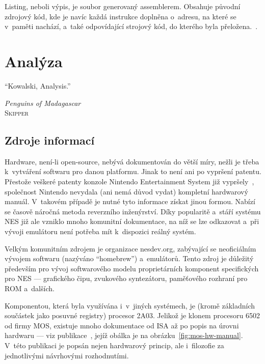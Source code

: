 \begin{definition}[Listing]
	Listing, neboli výpis, je soubor generovaný assemblerem. Obsahuje původní zdrojový kód, kde je navíc každá instrukce doplněna o~adresu, na které se v~paměti nachází, a~také odpovídající strojový kód, do kterého byla přeložena.~\cite{Plantz2021:computer-organization}.
\end{definition}

\chapter{Analýza}
\epigraph{
	\enquote{Kowalski, Analysis.}
}{\textit{Penguins of Madagascar}\\ \textsc{Skipper}}

\section{Zdroje informací}
Hardware, není-li open-source, nebývá dokumentován do větší míry, nežli je třeba k~vytváření softwaru pro danou platformu. Jinak to není ani po vypršení patentu. Přestože veškeré patenty konzole Nintendo Entertainment System již vypršely~\cite{Nesdev:patents}, společnost Nintendo nevydala (ani nemá důvod vydat) kompletní hardwarový manuál. V~takovém případě je nutné tyto informace získat jinou formou. Nabízí se časově náročná metoda reverzního inženýrství. Díky popularitě a~stáří systému NES již ale vzniklo mnoho komunitní dokumentace, na níž se lze odkazovat a~při vývoji emulátoru není potřeba mít k~dispozici reálný systém.

Velkým komunitním zdrojem je organizace nesdev.org, zabývající se neoficiálním vývojem softwaru (nazýváno \enquote{homebrew}) a~emulátorů. Tento zdroj je důležitý především pro vývoj softwarového modelu proprietárních komponent specifických pro NES --- grafického čipu, zvukového syntezátoru, paměťového rozhraní pro ROM a~dalších.

Komponentou, která byla využívána i~v~jiných systémech, je (kromě základních součástek jako posuvné registry) procesor 2A03. Jelikož je klonem procesoru 6502 od firmy MOS, existuje mnoho dokumentace od ISA až po popis na úrovni hardwaru --- viz publikace~\cite{mos:hw-manual}, jejíž obálka je na obrázku~\ref{fig:mos-hw-manual}. V~této publikaci je popsán nejen hardwarový princip, ale i~filozofie za jednotlivými návrhovými rozhodnutími.

